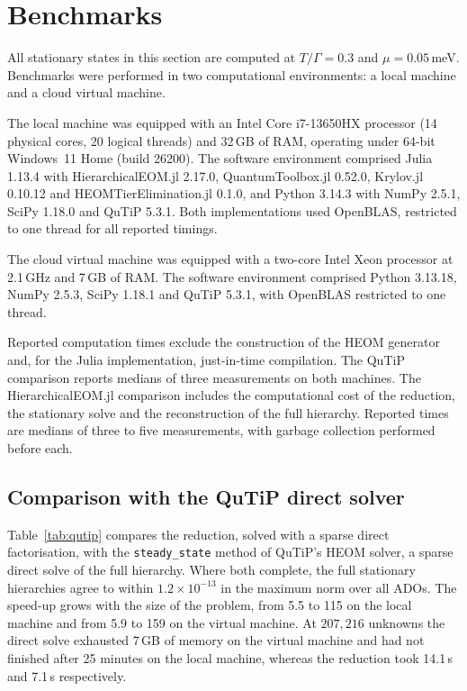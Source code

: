 \documentclass[11pt,a4paper]{article}
\begin{document}
\section{Benchmarks}\label{sec:bench}

All stationary states in this section are computed at $T/\Gamma = 0.3$ and
$\mu = 0.05$\,meV. Benchmarks were performed in two computational environments:
a local machine and a cloud virtual machine.

The local machine was equipped with an Intel Core i7-13650HX processor
(14 physical cores, 20 logical threads) and 32\,GB of RAM, operating under 64-bit
Windows~11 Home (build 26200). The software environment comprised Julia 1.13.4
with HierarchicalEOM.jl 2.17.0, QuantumToolbox.jl 0.52.0, Krylov.jl 0.10.12 and
HEOMTierElimination.jl 0.1.0, and Python 3.14.3 with NumPy 2.5.1, SciPy 1.18.0
and QuTiP 5.3.1. Both implementations used OpenBLAS, restricted to one thread
for all reported timings.

The cloud virtual machine was equipped with a two-core Intel Xeon processor at
2.1\,GHz and 7\,GB of RAM. The software environment comprised Python 3.13.18,
NumPy 2.5.3, SciPy 1.18.1 and QuTiP 5.3.1, with OpenBLAS restricted to one
thread.

Reported computation times exclude the construction of the HEOM generator and,
for the Julia implementation, just-in-time compilation. The QuTiP comparison
reports medians of three measurements on both machines. The HierarchicalEOM.jl comparison includes the computational cost of the
reduction, the stationary solve and the reconstruction of the full hierarchy.
Reported times are medians of three to five measurements, with garbage
collection performed before each.

\subsection{Comparison with the QuTiP direct solver}

Table~\ref{tab:qutip} compares the reduction, solved with a sparse direct
factorisation, with the \texttt{steady\_state} method of QuTiP's HEOM solver, a sparse direct
solve of the full hierarchy. Where both complete, the full stationary
hierarchies agree to within $1.2\times10^{-13}$ in the maximum norm over all
ADOs. The speed-up grows with the size of the problem, from 5.5 to 115 on the
local machine and from 5.9 to 159 on the virtual machine. At $207{,}216$ unknowns the direct solve exhausted
7\,GB of memory on the virtual machine and had not finished after 25 minutes on
the local machine, whereas the reduction took 14.1\,s and 7.1\,s respectively.
\end{document}
